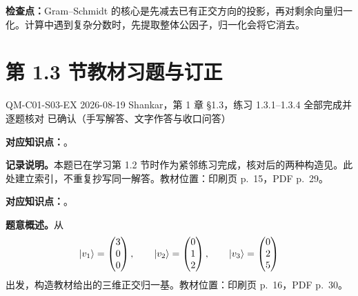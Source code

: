 \textbf{检查点：}Gram--Schmidt 的核心是先减去已有正交方向的投影，再对剩余向量归一化。计算中遇到复杂分数时，先提取整体公因子，归一化会将它消去。

\section{第 1.3 节教材习题与订正}
\label{exercise-set:QM-C01-S03}

\exercisemeta
  {QM-C01-S03-EX}
  {2026-08-19}
  {Shankar，第 1 章 \S 1.3，练习 1.3.1--1.3.4}
  {全部完成并逐题核对}
  {已确认（手写解答、文字作答与收口问答）}


\textbf{对应知识点：}。

\textbf{记录说明。}本题已在学习第 1.2 节时作为紧邻练习完成，核对后的两种构造见。此处建立索引，不重复抄写同一解答。教材位置：印刷页 p.~15，PDF p.~29。


\textbf{对应知识点：}。

\textbf{题意概述。}从
\[
  \left|v_1\right\rangle=\begin{pmatrix}3\\0\\0\end{pmatrix},
  \qquad
  \left|v_2\right\rangle=\begin{pmatrix}0\\1\\2\end{pmatrix},
  \qquad
  \left|v_3\right\rangle=\begin{pmatrix}0\\2\\5\end{pmatrix}
\]
出发，构造教材给出的三维正交归一基。教材位置：印刷页 p.~16，PDF p.~30。

